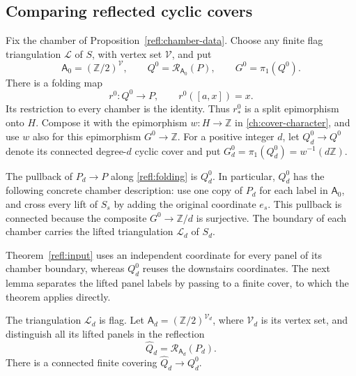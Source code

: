\subsection{Comparing reflected cyclic covers}

Fix the chamber of Proposition~\ref{refl:chamber-data}.  Choose any
finite flag triangulation $\mathcal L$
of $S$, with vertex set $\mathcal V$, and put
\[
 \mathsf A_0=(\mathbb Z/2)^{\mathcal V},\qquad
 Q^0=\mathcal R_{\mathsf A_0}(P),\qquad G^0=\pi_1(Q^0).
\]
There is a folding map
\begin{equation}\label{refl:folding}
 r^0\colon Q^0\longrightarrow P,
 \qquad r^0([a,x])=x.
\end{equation}
Its restriction to every chamber is the identity.  Thus $r^0_*$ is a
split epimorphism onto $H$.  Compose it with the epimorphism
$w\colon H\to\mathbb Z$ in \eqref{ch:cover-character}, and use
$w$ also for this epimorphism $G^0\to\mathbb Z$.
For a positive integer $d$, let $Q^0_d\to Q^0$ denote its connected
degree-$d$ cyclic cover and put
$G^0_d=\pi_1(Q^0_d)=w^{-1}(d\mathbb Z)$.

The pullback of $P_d\to P$ along \eqref{refl:folding} is $Q^0_d$.
In particular, $Q^0_d$ has the following concrete chamber description:
use one copy of $P_d$ for each label in $\mathsf A_0$, and cross every lift of
$S_s$ by adding the original coordinate $e_s$.  This pullback is
connected because the composite $G^0\to\mathbb Z/d$ is surjective.
The boundary of each chamber carries the lifted triangulation
$\mathcal L_d$ of $S_d$.

Theorem~\ref{refl:input} uses an independent coordinate for every panel
of its chamber boundary, whereas $Q^0_d$ reuses the downstairs
coordinates.  The next lemma separates the lifted panel labels by
passing to a finite cover, to which the theorem applies directly.

\begin{lemma}\label{refl:cover-comparison}
The triangulation $\mathcal L_d$ is flag.  Let
$\mathsf A_d=(\mathbb Z/2)^{\mathcal V_d}$, where $\mathcal V_d$ is its
vertex set, and distinguish all its lifted panels in the reflection
\[
 \widehat Q_d=\mathcal R_{\mathsf A_d}(P_d).
\]
There is a connected finite covering $\widehat Q_d\to Q^0_d$.
\end{lemma}

